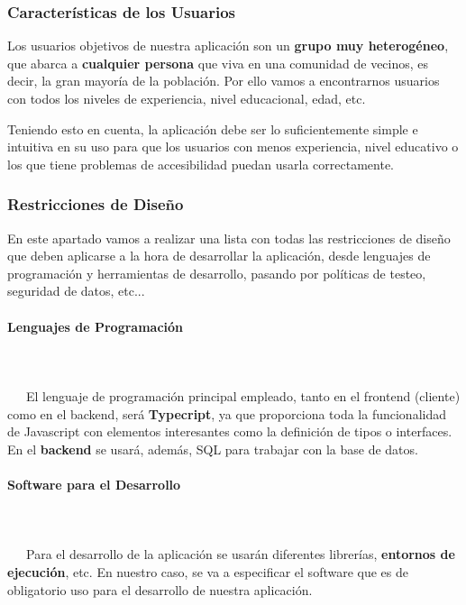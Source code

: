 \subsubsection{Características de los Usuarios}
Los usuarios objetivos de nuestra aplicación son un \textbf{grupo muy heterogéneo}, que abarca a \textbf{cualquier persona} que viva en una comunidad de vecinos, es decir, la gran mayoría de la población. Por ello vamos a encontrarnos usuarios con todos los niveles de experiencia, nivel educacional, edad, etc. 

Teniendo esto en cuenta, la aplicación debe ser lo suficientemente simple e intuitiva en su uso para que los usuarios con menos experiencia, nivel educativo o los que tiene problemas de accesibilidad puedan usarla correctamente.

\subsubsection{Restricciones de Diseño}
En este apartado vamos a realizar una lista con todas las restricciones de diseño que deben aplicarse a la hora de desarrollar la aplicación, desde lenguajes de programación y herramientas de desarrollo, pasando por políticas de testeo, seguridad de datos, etc...

\paragraph{Lenguajes de Programación}
~\\\\
\-\ \-\ \-\ El lenguaje de programación principal empleado, tanto en el \gls{frontend} (cliente) como en el \gls{backend}, será \textbf{Typecript}, ya que proporciona toda la funcionalidad de Javascript con elementos interesantes como la definición de tipos o interfaces. En el \textbf{backend} se usará, además, \gls{SQL} para trabajar con la base de datos.

\paragraph{Software para el Desarrollo}
~\\\\
\-\ \-\ \-\ Para el desarrollo de la aplicación se usarán diferentes \gls{librerías}, \textbf{entornos de ejecución}, etc. En nuestro caso, se va a especificar el software que es de obligatorio uso para el desarrollo de nuestra aplicación. 

